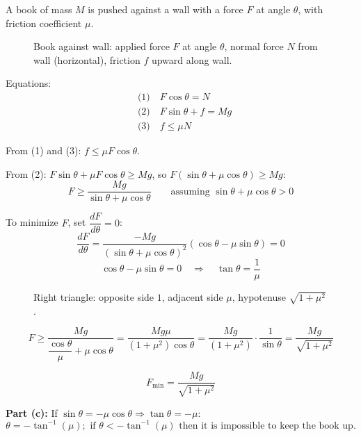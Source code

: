 \begin{example}
A book of mass $M$ is pushed against a wall with a force $F$ at angle $\theta$, with friction coefficient $\mu$.

\begin{figure}[H]
  \centering
  \caption{Book against wall: applied force $F$ at angle $\theta$, normal force $N$ from wall (horizontal), friction $f$ upward along wall.}
\end{figure}

Equations:
\begin{align*}
  &\text{(1)}\quad F\cos\theta = N \\
  &\text{(2)}\quad F\sin\theta + f = Mg \\
  &\text{(3)}\quad f \leq \mu N
\end{align*}

From (1) and (3): $f \leq \mu F\cos\theta$.

From (2): $F\sin\theta + \mu F\cos\theta \geq Mg$, so $F(\sin\theta + \mu\cos\theta) \geq Mg$:
\[
  \boxed{F \geq \frac{Mg}{\sin\theta + \mu\cos\theta}} \qquad \text{assuming } \sin\theta + \mu\cos\theta > 0
\]

To minimize $F$, set $\dfrac{dF}{d\theta} = 0$:
\[
  \frac{dF}{d\theta} = \frac{-Mg}{(\sin\theta+\mu\cos\theta)^2}(\cos\theta - \mu\sin\theta) = 0
\]
\[
  \cos\theta - \mu\sin\theta = 0 \quad \Rightarrow \quad \boxed{\tan\theta = \frac{1}{\mu}}
\]

\begin{figure}[H]
  \centering
  \caption{Right triangle: opposite side $1$, adjacent side $\mu$, hypotenuse $\sqrt{1+\mu^2}$.}
\end{figure}

\[
  F \geq \frac{Mg}{\dfrac{\cos\theta}{\mu}+\mu\cos\theta} = \frac{Mg\mu}{(1+\mu^2)\cos\theta} = \frac{Mg}{(1+\mu^2)}\cdot\frac{1}{\sin\theta} = \frac{Mg}{\sqrt{1+\mu^2}}
\]

\[
  \boxed{F_\text{min} = \frac{Mg}{\sqrt{1+\mu^2}}}
\]

\textbf{Part (c):} If $\sin\theta = -\mu\cos\theta \Rightarrow \tan\theta = -\mu$:
\[
  \theta = -\tan^{-1}(\mu); \text{ if } \theta < -\tan^{-1}(\mu) \text{ then it is impossible to keep the book up.}
\]
\end{example}

